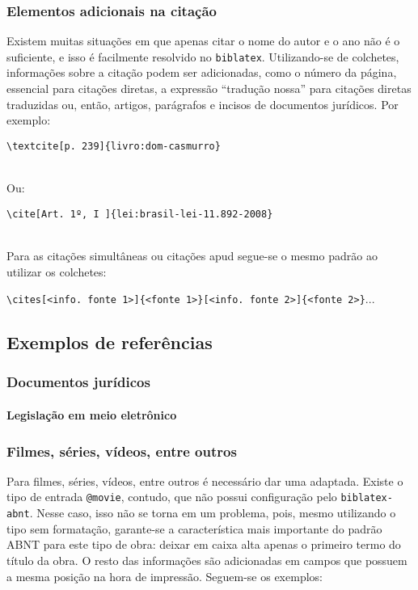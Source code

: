 
\subsubsection{Elementos adicionais na citação}
Existem muitas situações em que apenas citar o nome do autor e o ano não é o suficiente, e isso é facilmente resolvido no \verb|biblatex|. Utilizando-se de colchetes, informações sobre a citação podem ser adicionadas, como o número da página, essencial para citações diretas, a expressão ``tradução nossa'' para citações diretas traduzidas ou, então, artigos, parágrafos e incisos de documentos jurídicos. Por exemplo:

\verb|\textcite[p. 239]{livro:dom-casmurro}|

\textcite[p. 239]{livro:dom-casmurro}\\

Ou:

\verb|\cite[Art. 1º, I ]{lei:brasil-lei-11.892-2008}|

\cite[Art. 1º, I ]{lei:brasil-lei-11.892-2008}\\

Para as citações simultâneas ou citações apud segue-se o mesmo padrão ao utilizar os colchetes:

\verb|\cites[<info. fonte 1>]{<fonte 1>}[<info. fonte 2>]{<fonte 2>}|...

\subsection{Exemplos de referências}

\subsubsection{Documentos jurídicos}
\paragraph{Legislação em meio eletrônico}


\subsubsection{Filmes, séries, vídeos, entre outros}
Para filmes, séries, vídeos, entre outros é necessário dar uma adaptada. Existe o tipo de entrada \texttt{@movie}, contudo, que não possui configuração pelo \texttt{biblatex-abnt}. Nesse caso, isso não se torna em um problema, pois, mesmo utilizando o tipo sem formatação, garante-se a característica mais importante do padrão ABNT para este tipo de obra: deixar em caixa alta apenas o primeiro termo do título da obra. O resto das informações são adicionadas em campos que possuem a mesma posição na hora de impressão\footnotemark. Seguem-se os exemplos:

